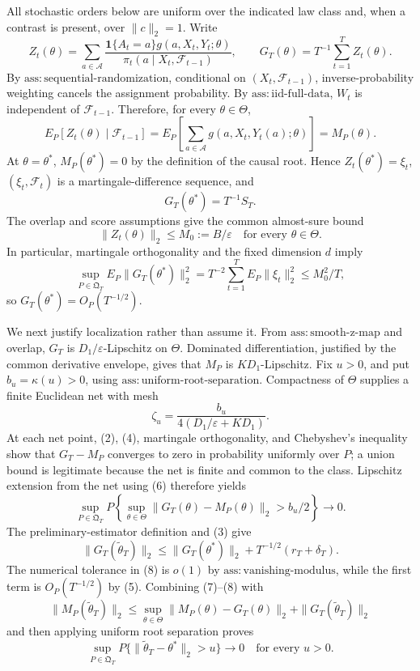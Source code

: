 All stochastic orders below are uniform over the indicated law class and, when a contrast is present, over \(\|c\|_2=1\). Write
\[
 Z_t(\theta)=\sum_{a\in\mathcal A}
 \frac{\mathbf 1\{A_t=a\}g(a,X_t,Y_t;\theta)}
 {\pi_t(a\mid X_t,\mathcal F_{t-1})},
 \qquad G_T(\theta)=T^{-1}\sum_{t=1}^T Z_t(\theta).
\tag{1}
\]
By \(\mathrm{ass:sequential\text{-}randomization}\), conditional on \((X_t,\mathcal F_{t-1})\), inverse-probability weighting cancels the assignment probability. By \(\mathrm{ass:iid\text{-}full\text{-}data}\), \(W_t\) is independent of \(\mathcal F_{t-1}\). Therefore, for every \(\theta\in\Theta\),
\[
 E_P[Z_t(\theta)\mid\mathcal F_{t-1}]
 =E_P\!\left[\sum_{a\in\mathcal A}g(a,X_t,Y_t(a);\theta)\right]
 =M_P(\theta).
\tag{2}
\]
At \(\theta=\theta^*\), \(M_P(\theta^*)=0\) by the definition of the causal root. Hence \(Z_t(\theta^*)=\xi_t\), \((\xi_t,\mathcal F_t)\) is a martingale-difference sequence, and
\[
 G_T(\theta^*)=T^{-1}S_T.
\tag{3}
\]
The overlap and score assumptions give the common almost-sure bound
\[
 \|Z_t(\theta)\|_2\le M_0:=B/\varepsilon
 \quad\text{for every }\theta\in\Theta.
\tag{4}
\]
In particular, martingale orthogonality and the fixed dimension \(d\) imply
\[
 \sup_{P\in\mathfrak Q_T}E_P\|G_T(\theta^*)\|_2^2
 =T^{-2}\sum_{t=1}^TE_P\|\xi_t\|_2^2
 \le M_0^2/T,
\tag{5}
\]
so \(G_T(\theta^*)=O_P(T^{-1/2})\).

We next justify localization rather than assume it. From \(\mathrm{ass:smooth\text{-}z\text{-}map}\) and overlap, \(G_T\) is \(D_1/\varepsilon\)-Lipschitz on \(\Theta\). Dominated differentiation, justified by the common derivative envelope, gives that \(M_P\) is \(KD_1\)-Lipschitz. Fix \(u>0\), and put \(b_u=\kappa(u)>0\), using \(\mathrm{ass:uniform\text{-}root\text{-}separation}\). Compactness of \(\Theta\) supplies a finite Euclidean net with mesh
\[
 \zeta_u=\frac{b_u}{4(D_1/\varepsilon+KD_1)}.
\tag{6}
\]
At each net point, (2), (4), martingale orthogonality, and Chebyshev's inequality show that \(G_T-M_P\) converges to zero in probability uniformly over \(P\); a union bound is legitimate because the net is finite and common to the class. Lipschitz extension from the net using (6) therefore yields
\[
 \sup_{P\in\mathfrak Q_T}P\!\left\{
 \sup_{\theta\in\Theta}\|G_T(\theta)-M_P(\theta)\|_2>b_u/2
 \right\}\longrightarrow0.
\tag{7}
\]
The preliminary-estimator definition and (3) give
\[
 \|G_T(\widetilde\theta_T)\|_2
 \le \|G_T(\theta^*)\|_2+T^{-1/2}(r_T+\delta_T).
\tag{8}
\]
The numerical tolerance in (8) is \(o(1)\) by \(\mathrm{ass:vanishing\text{-}modulus}\), while the first term is \(O_P(T^{-1/2})\) by (5). Combining (7)--(8) with
\[
 \|M_P(\widetilde\theta_T)\|_2
 \le\sup_{\theta\in\Theta}\|M_P(\theta)-G_T(\theta)\|_2
     +\|G_T(\widetilde\theta_T)\|_2
\tag{9}
\]
and then applying uniform root separation proves
\[
 \sup_{P\in\mathfrak Q_T}P\{\|\widetilde\theta_T-\theta^*\|_2>u\}
 \longrightarrow0
 \quad\text{for every }u>0.
\tag{10}
\]

